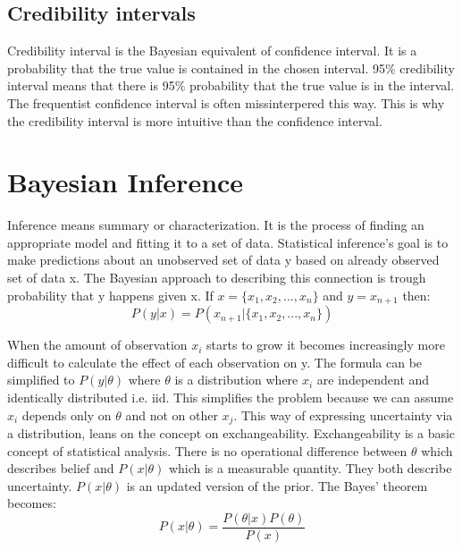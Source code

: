 \subsection*{Credibility intervals}\label{CredibilityIntervals}
Credibility interval is the Bayesian equivalent of confidence interval. It is a probability that the true value is contained in the chosen interval. 95\% credibility interval means that there is 95\% probability that the true value is in the interval. The frequentist confidence interval is often missinterpered this way. This is why the credibility interval is more intuitive than the confidence interval.\cite{FornaconWood2022UnderstandingTD}

\section{Bayesian Inference}\label{BayesianInference}
Inference means summary or characterization\cite{Robert2007TheBC}. It is the process of finding an appropriate model and fitting it to a set of data.\cite{Gel2014BayesianDA} Statistical inference's goal is to make predictions about an unobserved set of data y based on already observed set of data x.\cite{Lindley1990The1W}\cite{Gel2014BayesianDA} The Bayesian approach to describing this connection is trough probability that y happens given x. If $x = \{x_1, x_2, ..., x_n \}$ and $y = x_{n + 1}$ then:
\begin{equation}
P(y|x) = P(x_{n + 1}|\{x_1, x_2, ..., x_n \})
\end{equation}

When the amount of observation $x_i$ starts to grow it becomes increasingly more difficult to calculate the effect of each observation on y. The formula can be simplified to $P(y|\theta)$ where $\theta$ is a distribution where $x_i$ are independent and identically distributed i.e. iid. This simplifies the problem because we can assume $x_i$ depends only on $\theta$ and not on other $x_j$.\cite{Lindley1990The1W} This way of expressing uncertainty via a distribution, leans on the concept on exchangeability. Exchangeability is a basic concept of statistical analysis. \cite{Gel2014BayesianDA}  There is no operational difference between $\theta$ which describes belief and $P(x|\theta)$ which is a measurable quantity. They both describe uncertainty. $P(x|\theta)$ is an updated version of the prior. The Bayes' theorem becomes: 
\begin{equation}
P(x|\theta) = \frac{P(\theta|x)P(\theta)}{P(x)}
\end{equation}
\cite{Pawitan2002InAL}

